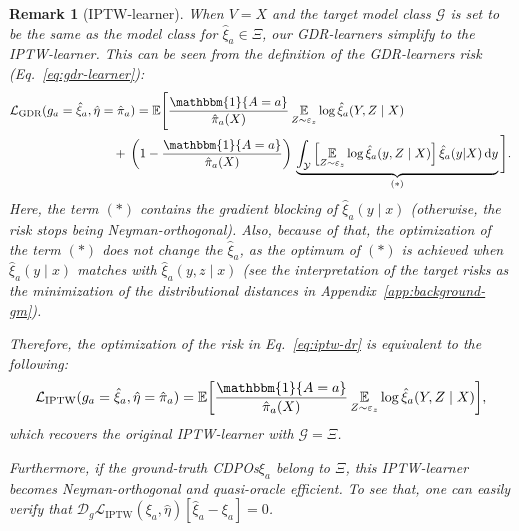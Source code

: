 \documentclass[dvipsnames]{article} %
\newcommand*\diff{\mathop{}\!\mathrm{d}}
\newtheorem{rem}{Remark}
\newcommand{\GDRlearners}{\emph{GDR-learners}\xspace}
\newcommand{\CDPOs}{CDPOs\xspace}
\begin{document}
\begin{rem}[IPTW-learner] \label{rem:iptw-vs-dr}
    When $V = X$ and the target model class $\mathcal{G}$ is set to be the same as the model class for $\hat{\xi}_a \in \mathit{\Xi}$, our \GDRlearners simplify to the IPTW-learner. This can be seen from the definition of the \emph{\GDRlearners} risk (Eq.~\eqref{eq:gdr-learner}):
    \begingroup\makeatletter\def\f@size{9}\check@mathfonts
    \begin{align} \label{eq:iptw-dr}
        {\mathcal{L}}_\text{GDR}(g_a = \hat{\xi}_a, \hat{\eta} & = \hat{\pi}_a) = \mathbb{E}\Bigg[\frac{\mathbbm{1}\{A = a\}}{\hat{\pi}_a(X)} \, \underset{Z \sim \varepsilon_z }{\mathbb{E}} \log \hat{\xi}_a(Y, Z \mid X) \,  \\
        & \quad + \, \left(1 - \frac{\mathbbm{1}\{A = a\}}{\hat{\pi}_a(X)} \right)\, \underbrace{\int_\mathcal{Y} \Big[\underset{Z \sim \varepsilon_z }{\mathbb{E}} \log \hat{\xi}_a(y, Z \mid X) \Big] \, \hat{\xi}_a(y | X) \diff{y}}_{(*)} \Bigg]. \nonumber
    \end{align}
    \endgroup
    Here, the term $(*)$ contains the gradient blocking of $\hat{\xi}_a(y \mid x)$ (otherwise, the risk stops being Neyman-orthogonal). Also, because of that, the optimization of the term $(*)$ does not change the $\hat{\xi}_a$, as the optimum of $(*)$ is achieved when $\hat{\xi}_a(y \mid x)$ matches with $\hat{\xi}_a(y, z \mid x)$ (see the interpretation of the target risks as the minimization of the distributional distances in Appendix~\ref{app:background-gm}).

    Therefore, the optimization of the risk in Eq.~\eqref{eq:iptw-dr} is equivalent to the following:
    \begingroup\makeatletter\def\f@size{9}\check@mathfonts
    \begin{align} 
        {\mathcal{L}}_\text{IPTW}(g_a = \hat{\xi}_a, \hat{\eta} = \hat{\pi}_a) = \mathbb{E}\bigg[\frac{\mathbbm{1}\{A = a\}}{\hat{\pi}_a(X)} \, \underset{Z \sim \varepsilon_z }{\mathbb{E}} \log \hat{\xi}_a(Y, Z \mid X) \bigg],
    \end{align}
    \endgroup
    which recovers the original IPTW-learner with $\mathcal{G} = \mathit{\Xi}$.
    
    Furthermore, if the ground-truth \CDPOs $\xi_a$ belong to $\mathit{\Xi}$, this IPTW-learner becomes Neyman-orthogonal and quasi-oracle efficient. To see that, one can easily verify that \mbox{$\mathcal{D}_g\mathcal{L}_\text{{IPTW}}({\xi}_a, \hat{\eta})[\hat{\xi}_a - \xi_a] =0$}.
    
\end{rem}
    
\end{document}
